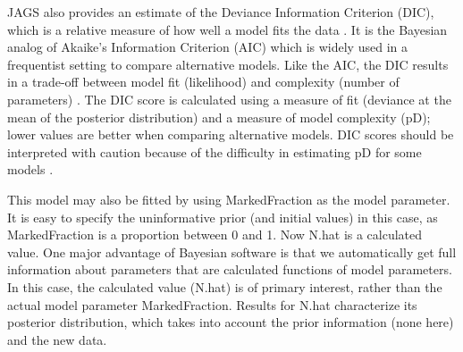 \documentclass[
]{krantz}
\begin{document}
JAGS also provides an estimate of the Deviance Information Criterion (DIC), which is a relative measure of how well a model fits the data \citep{mccarthy_2007, lunn.etal2009}. It is the Bayesian analog of Akaike's Information Criterion (AIC) which is widely used in a frequentist setting to compare alternative models. Like the AIC, the DIC results in a trade-off between model fit (likelihood) and complexity (number of parameters) \citep{mccarthy_2007}. The DIC score is calculated using a measure of fit (deviance at the mean of the posterior distribution) and a measure of model complexity (pD); lower values are better when comparing alternative models. DIC scores should be interpreted with caution because of the difficulty in estimating pD for some models \citep{lunn.etal2009}.

This model may also be fitted by using MarkedFraction as the model parameter. It is easy to specify the uninformative prior (and initial values) in this case, as MarkedFraction is a proportion between 0 and 1. Now N.hat is a calculated value. One major advantage of Bayesian software is that we automatically get full information about parameters that are calculated functions of model parameters. In this case, the calculated value (N.hat) is of primary interest, rather than the actual model parameter MarkedFraction. Results for N.hat characterize its posterior distribution, which takes into account the prior information (none here) and the new data.
\end{document}
